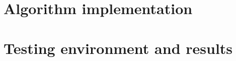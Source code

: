 \newcommand{\lineann}[4][0.5]{%
    \begin{scope}[rotate=#2, blue,inner sep=2pt]
        \draw[dashed, blue!40] (0,0) -- +(0,#1)
            node [coordinate, near end] (a) {};
        \draw[dashed, blue!40] (#3,0) -- +(0,#1)
            node [coordinate, near end] (b) {};
        \draw[|<->|] (a) -- node[fill=white] {#4} (b);
    \end{scope}
}

\newcommand{\view}[4]{%
    \begin{scope}[rotate=#2, blue,inner sep=2pt]
        \draw[dashed, blue!40] (0,0) -- +(0,#1)
            node [coordinate, near end] (a) {};
        \draw[dashed, blue!40] (#3,0) -- +(0,#1)
            node [coordinate, near end] (b) {};
        \draw[|<->|] (a) -- node[fill=white] {#4} (b);
    \end{scope}
}


\def\thetaone{120}
\def\Lone{2}
\def\thetatwo{-60}
\def\Ltwo{2}
\def\thetathree{-20}
\def\Lthree{1}




\section{Algorithm implementation}
\label{sec:implementatnion}



\section{Testing environment and results}
\label{sec:testing}

